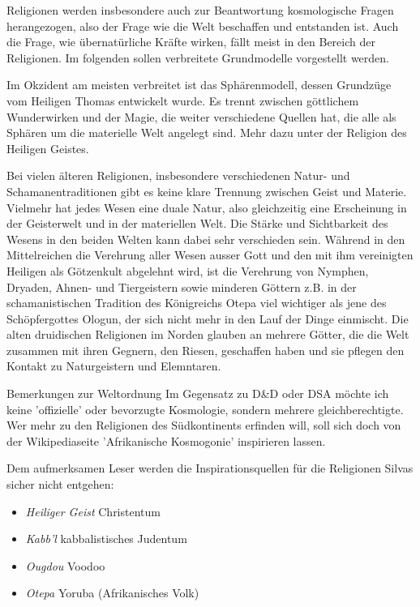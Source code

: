 \documentclass[10pt,twoside,twocolumn,openany]{book}
\begin{document}
	Religionen werden insbesondere auch zur Beantwortung kosmologische Fragen herangezogen, also der Frage wie die Welt beschaffen und entstanden ist. Auch die Frage, wie übernatürliche Kräfte wirken, fällt meist in den Bereich der Religionen.
	Im folgenden sollen verbreitete Grundmodelle vorgestellt werden.
	
	Im Okzident am meisten verbreitet ist das Sphärenmodell, dessen Grundzüge vom Heiligen Thomas entwickelt wurde. Es trennt zwischen göttlichem Wunderwirken und der Magie, die weiter verschiedene Quellen hat, die alle als Sphären um die materielle Welt angelegt sind. Mehr dazu unter der Religion des Heiligen Geistes.
	
	Bei vielen älteren Religionen, insbesondere verschiedenen Natur- und Schamanentraditionen gibt es keine klare Trennung zwischen Geist und Materie. Vielmehr hat jedes Wesen eine duale Natur, also gleichzeitig eine Erscheinung in der Geisterwelt und in der materiellen Welt. Die Stärke und Sichtbarkeit des Wesens in den beiden Welten kann dabei sehr verschieden sein. Während in den Mittelreichen die Verehrung aller Wesen ausser Gott und den mit ihm vereinigten Heiligen als Götzenkult abgelehnt wird, ist die Verehrung von Nymphen, Dryaden, Ahnen- und Tiergeistern sowie minderen Göttern z.B. in der schamanistischen Tradition des Königreichs Otepa viel wichtiger als jene des Schöpfergottes Ologun, der sich nicht mehr in den Lauf der Dinge einmischt. Die alten druidischen Religionen im Norden glauben an mehrere Götter, die die Welt zusammen mit ihren Gegnern, den Riesen, geschaffen haben und sie pflegen den Kontakt zu Naturgeistern und Elemntaren.

\begin{table}[htpb]
	\begin{commentbox}{Bemerkungen zur Weltordnung}
		Im Gegensatz zu D\&D oder DSA möchte ich keine 'offizielle' oder bevorzugte Kosmologie, sondern mehrere gleichberechtigte. Wer mehr zu den Religionen des Südkontinents erfinden will, soll sich doch von der Wikipediaseite 'Afrikanische Kosmogonie' inspirieren lassen.
		
		Dem aufmerksamen Leser werden die Inspirationsquellen für die Religionen Silvas sicher nicht entgehen:
		\begin{itemize}
			\item \emph{Heiliger Geist} Christentum
			\item \emph{Kabb'l} kabbalistisches Judentum
			\item \emph{Ougdou} Voodoo
			\item \emph{Otepa} Yoruba (Afrikanisches Volk)
		\end{itemize}
	\end{commentbox}
\end{table}
	
\end{document}

